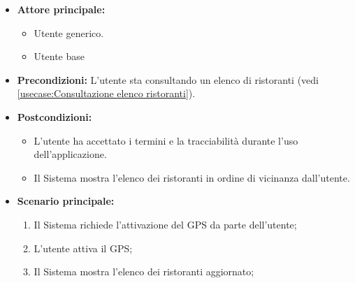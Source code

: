 \label{usecase:Abilitazione GPS}
\begin{itemize}
	\item \textbf{Attore principale:}
    \begin{itemize}
        \item Utente generico.
        \item Utente base
    \end{itemize}
	
	\item \textbf{Precondizioni:} L'utente sta consultando un elenco di ristoranti (vedi \autoref{usecase:Consultazione elenco ristoranti}).

	\item \textbf{Postcondizioni:}
    \begin{itemize}
        \item L'utente ha accettato i termini e la tracciabilità durante l'uso dell'applicazione.
        \item Il Sistema mostra l'elenco dei ristoranti in ordine di vicinanza dall'utente.
    \end{itemize}
	      
	\item \textbf{Scenario principale:}
	      \begin{enumerate}
		      \item Il Sistema richiede l'attivazione del GPS da parte dell'utente;

		      \item L'utente attiva il GPS;

		      \item Il Sistema mostra l'elenco dei ristoranti aggiornato;
	      \end{enumerate}

\end{itemize}


